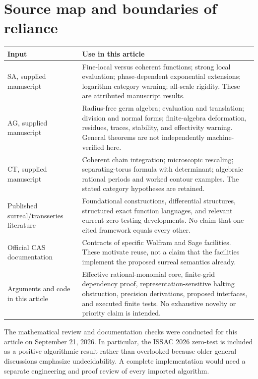 \documentclass[11pt,letterpaper]{article}
\theoremstyle{definition}\newtheorem{definition}[theorem]{Definition}
\theoremstyle{remark}\newtheorem{remark}[theorem]{Remark}
\numberwithin{equation}{section}\setcounter{tocdepth}{2}
\begin{document}
\section{Source map and boundaries of reliance}\label{app:sources}
\begin{center}\small
\begin{longtable}{@{}L{0.25\textwidth}L{0.66\textwidth}@{}}
\toprule Input & Use in this article\\\midrule\endhead
SA, supplied manuscript & Fine-local versus coherent functions; strong local evaluation; phase-dependent exponential extensions; logarithm category warning; all-scale rigidity. These are attributed manuscript results.\\[0.4em]
AG, supplied manuscript & Radius-free germ algebra; evaluation and translation; division and normal forms; finite-algebra deformation, residues, traces, stability, and effectivity warning. General theorems are not independently machine-verified here.\\[0.4em]
CT, supplied manuscript & Coherent chain integration; microscopic rescaling; separating-torus formula with determinant; algebraic rational periods and worked contour examples. The stated category hypotheses are retained.\\[0.4em]
Published surreal/transseries literature & Foundational constructions, differential structures, structured exact function languages, and relevant current zero-testing developments. No claim that one cited framework equals every other.\\[0.4em]
Official CAS documentation & Contracts of specific Wolfram and Sage facilities. These motivate reuse, not a claim that the facilities implement the proposed surreal semantics already.\\[0.4em]
Arguments and code in this article & Effective rational-monomial core, finite-grid dependency proof, representation-sensitive halting obstruction, precision derivations, proposed interfaces, and executed finite tests. No exhaustive novelty or priority claim is intended.\\
\bottomrule
\end{longtable}\end{center}
The mathematical review and documentation checks were conducted for this article on September 21, 2026. In particular, the ISSAC 2026 zero-test is included as a positive algorithmic result rather than overlooked because older general discussions emphasize undecidability. A complete implementation would need a separate engineering and proof review of every imported algorithm.
\end{document}
